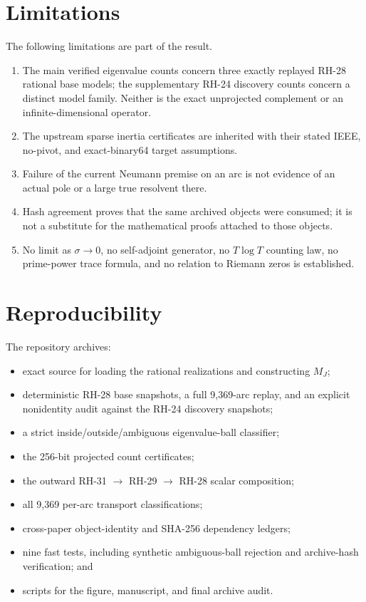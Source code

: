 \documentclass[11pt]{article}
\theoremstyle{definition}
\theoremstyle{remark}
\begin{document}
\section{Limitations}
\label{sec:limitations}

The following limitations are part of the result.

\begin{enumerate}
 \item The main verified eigenvalue counts concern three exactly replayed
       RH-28 rational base models; the supplementary RH-24 discovery counts
       concern a distinct model family.  Neither is the exact unprojected
       complement or an infinite-dimensional operator.
 \item The upstream sparse inertia certificates are inherited with their
       stated IEEE, no-pivot, and exact-binary64 target assumptions.
 \item Failure of the current Neumann premise on an arc is not evidence of
       an actual pole or a large true resolvent there.
 \item Hash agreement proves that the same archived objects were consumed;
       it is not a substitute for the mathematical proofs attached to those
       objects.
 \item No limit as $\sigma\to0$, no self-adjoint generator, no
       $T\log T$ counting law, no prime-power trace formula, and no relation
       to Riemann zeros is established.
\end{enumerate}


\section{Reproducibility}
\label{sec:reproducibility}

The repository archives:

\begin{itemize}
 \item exact source for loading the rational realizations and constructing
       $M_J$;
 \item deterministic RH-28 base snapshots, a full 9,369-arc replay, and an
       explicit nonidentity audit against the RH-24 discovery snapshots;
 \item a strict inside/outside/ambiguous eigenvalue-ball classifier;
 \item the 256-bit projected count certificates;
 \item the outward RH-31 $\to$ RH-29 $\to$ RH-28 scalar composition;
 \item all 9,369 per-arc transport classifications;
 \item cross-paper object-identity and SHA-256 dependency ledgers;
 \item nine fast tests, including synthetic ambiguous-ball rejection and
       archive-hash verification; and
 \item scripts for the figure, manuscript, and final archive audit.
\end{itemize}
\end{document}
